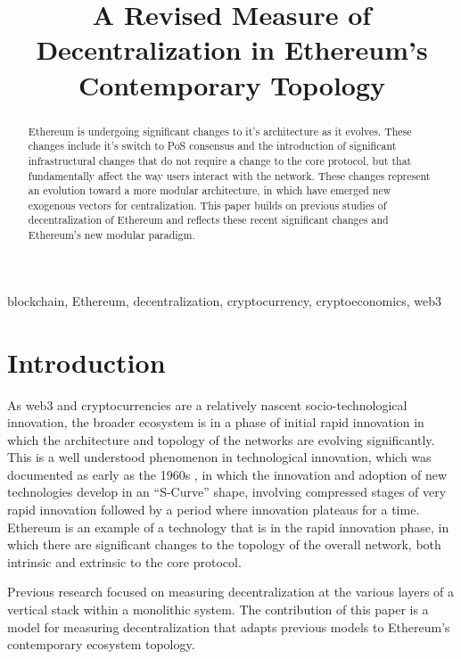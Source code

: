 \documentclass[conference]{IEEEtran}
\begin{document}
\title{A Revised Measure of Decentralization in Ethereum's Contemporary Topology}

\author{
}

\maketitle

\begin{abstract}
Ethereum is undergoing significant changes to it's architecture as it evolves.  These changes include it's switch to PoS consensus and the introduction of significant infrastructural changes that do not require a change to the core protocol, but that fundamentally affect the way users interact with the network.  These changes represent an evolution toward a more modular architecture, in which have emerged new exogenous vectors for centralization.  This paper builds on previous studies of decentralization of Ethereum and reflects these recent significant changes and Ethereum's new modular paradigm.
\end{abstract}

\begin{IEEEkeywords}
blockchain, Ethereum, decentralization, cryptocurrency, cryptoeconomics, web3
\end{IEEEkeywords}

\section{Introduction}

As web3 and cryptocurrencies are a relatively nascent socio-technological innovation, the broader ecosystem is in a phase of initial rapid innovation in which the architecture and topology of the networks are evolving significantly.  This is a well understood phenomenon in technological innovation, which was documented as early as the 1960s \cite{rogers2010diffusion}, in which the innovation and adoption of new technologies develop in an “S-Curve” shape, involving compressed stages of very rapid innovation followed by a period where innovation plateaus for a time.  Ethereum is an example of a technology that is in the rapid innovation phase, in which there are significant changes to the topology of the overall network, both intrinsic and extrinsic to the core protocol.

Previous research \cite{gochhayat2020measuring, lin2021measuring, karakostas2022sok} focused on measuring decentralization at the various layers of a vertical stack within a monolithic system.  The contribution of this paper is a model for measuring decentralization that adapts previous models to Ethereum's contemporary ecosystem topology.
\end{document}

